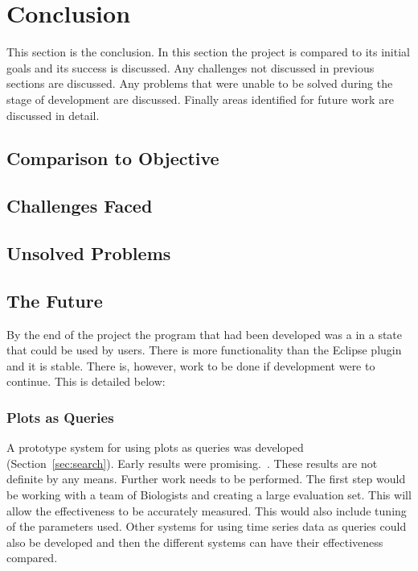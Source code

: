 \chapter{Conclusion}

This section is the conclusion.  In this section the project is compared to its initial goals and its success is discussed.  Any challenges not discussed in previous sections are discussed.  Any problems that were unable to be solved during the stage of development are discussed.  Finally areas identified for future work are discussed in detail.

\section{Comparison to Objective}


\section{Challenges Faced}



\section{Unsolved Problems}


\section{The Future}

By the end of the project the program that had been developed was a in a state that could be used by users.  There is more functionality than the Eclipse plugin and it is stable.  There is, however, work to be done if development were to continue.  This is detailed below:

\subsection{Plots as Queries}
A prototype system for using plots as queries was developed (Section~\ref{sec:search}).  Early results were promising.~.  These results are not definite by any means.  Further work needs to be performed.  The first step would be working with a team of Biologists and creating a large evaluation set.  This will allow the effectiveness to be accurately measured.  This would also include tuning of the parameters used.  Other systems for using time series data as queries could also be developed and then the different systems can have their effectiveness compared.

